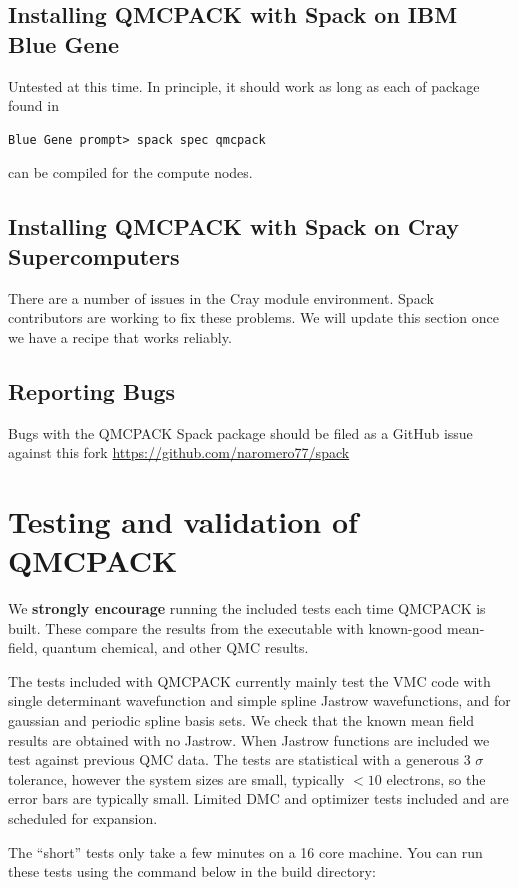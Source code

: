 \subsection{Installing QMCPACK with Spack on IBM Blue Gene}
Untested at this time. In principle, it should work as long as each of
package found in
\verbatimfont{\footnotesize}
\begin{verbatim}
Blue Gene prompt> spack spec qmcpack
\end{verbatim}
can be compiled for the compute nodes.

\subsection{Installing QMCPACK with Spack on Cray Supercomputers}
There are a number of issues in the Cray module environment. Spack
contributors are working to fix these problems. We will update this
section once we have a recipe that works reliably.

\subsection{Reporting Bugs}
Bugs with the QMCPACK Spack package should be filed as a GitHub issue
against this fork \url{https://github.com/naromero77/spack}

\section{Testing and validation of QMCPACK}
\label{sec:testing}
We \textbf{strongly encourage} running the included tests each time
QMCPACK is built. These compare the results from the executable with
known-good mean-field, quantum chemical, and other QMC results.

The tests included with QMCPACK currently mainly test the VMC code with
single determinant wavefunction and simple spline Jastrow
wavefunctions, and for gaussian and periodic spline basis
sets. We check that the known mean
field results are obtained with no Jastrow. When Jastrow functions are
included we test against previous QMC data. The tests are statistical
with a generous 3 $\sigma$ tolerance, however the system sizes are
small, typically $<10$ electrons, so the error bars are typically
small. Limited DMC and optimizer tests included and are scheduled for expansion.

 The ``short'' tests only take a few minutes on a 16
core machine. You can run these tests using the command below in the
build directory:

